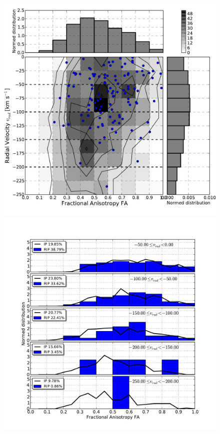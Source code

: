 \documentclass[usenatbib]{latex/mn2e}
\begin{document}
\begin{flushleft}
\begin{figure}
\begin{center}

  \includegraphics[trim = 2mm 9mm 3mm 4mm, clip, keepaspectratio=true,
  width=0.36\textheight]{./figures/2D_radialvelocity_FA_BDM_Tweb}
  \includegraphics[trim = 4mm 9mm 17mm 15mm, clip, keepaspectratio=true,
  width=0.36\textheight]{./figures/single_radialvelocity_FA_BDM_Tweb}
  

\end{center}
\end{figure}
\end{flushleft}
\end{document}
